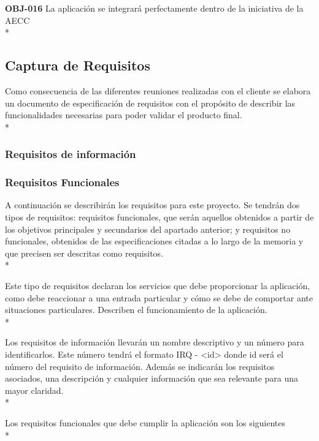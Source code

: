 \documentclass[../pfc.tex]{subfiles}
\begin{document}
	\textbf{OBJ-016}	La aplicación se integrará perfectamente dentro de la iniciativa de la AECC\\*
	
	

	
	
	\subsection{Captura de Requisitos}
	
	Como consecuencia de las diferentes reuniones realizadas con el cliente se elabora un
	documento de especificación de requisitos con el propósito de describir las funcionalidades
	necesarias para poder validar el producto final.\\*
	
	\subsubsection{Requisitos de información}
			
	
	\subsubsection{Requisitos Funcionales}
	
	A continuación se describirán los requisitos para este proyecto. Se tendrán dos tipos de
	requisitos: requisitos funcionales, que serán aquellos obtenidos a partir de los objetivos principales
	y secundarios del apartado anterior; y requisitos no funcionales, obtenidos de las especificaciones
	citadas a lo largo de la memoria y que precisen ser descritas como requisitos.\\*
	
	Este tipo de requisitos declaran los servicios que debe proporcionar la aplicación, como debe
	reaccionar a una entrada particular y cómo se debe de comportar ante situaciones particulares.
	Describen el funcionamiento de la aplicación.\\*
	
	Los requisitos de información llevarán un nombre descriptivo y un número para identificarlos.
	Este número tendrá el formato IRQ - <id> donde id será el número del requisito de información.
	Además se indicarán los requisitos asociados, una descripción y cualquier información que sea
	relevante para una mayor claridad.\\*
	
	Los requisitos funcionales que debe cumplir la aplicación son los siguientes\\*
	
\end{document}
